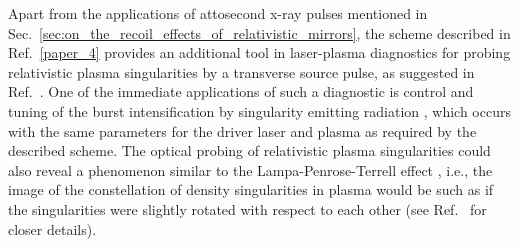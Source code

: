 \documentclass[10pt, a4paper, twoside, openright]{report}
\begin{document}
Apart from the applications of attosecond x-ray pulses mentioned in Sec.~\ref{sec:on_the_recoil_effects_of_relativistic_mirrors}, the scheme described in Ref.~\ref{paper_4} provides an additional tool in laser-plasma diagnostics for probing relativistic plasma singularities by a transverse source pulse, as suggested in Ref.~. One of the immediate applications of such a diagnostic is control and tuning of the burst intensification by singularity emitting radiation \cite{Pirozhkov2012, Pirozhkov2014, Pirozhkov2017, Pirozhkov2018, Sagisaka2020}, which occurs with the same parameters for the driver laser and plasma as required by the described scheme. The optical probing of relativistic plasma singularities could also reveal a phenomenon similar to the Lampa-Penrose-Terrell effect \cite{Lampa1924, Penrose1959, Terrell1959}, i.e., the image of the constellation of density singularities in plasma would be such as if the singularities were slightly rotated with respect to each other (see Ref.~ for closer details).





\end{document}

